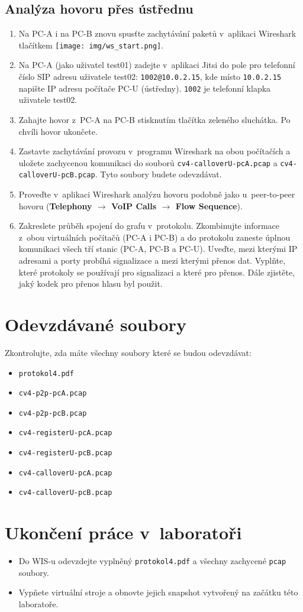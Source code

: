 \subsection{Analýza hovoru přes ústřednu}
\begin{enumerate}
    \item Na PC-A i na PC-B znovu spusťte zachytávání paketů v aplikaci Wireshark tlačítkem \texttt{[image: img/ws\_start.png]}.
    \item Na PC-A (jako uživatel test01) zadejte v~aplikaci Jitsi do pole pro telefonní číslo SIP adresu uživatele test02: {\tt 1002@10.0.2.15}, kde místo {\tt 10.0.2.15} napište IP adresu počítače PC-U (ústředny). {\tt 1002} je telefonní klapka uživatele test02.
    \item Zahajte hovor z~PC-A na PC-B stisknutím tlačítka zeleného sluchátka. Po chvíli hovor ukončete.
	\item Zastavte zachytávání provozu v~programu Wireshark na obou počítačích a uložete zachycenou komunikaci do souborů \texttt{cv4-calloverU-pcA.pcap} a \texttt{cv4-calloverU-pcB.pcap}. Tyto soubory budete odevzdávat.
	\item Proveďte v~aplikaci Wireshark analýzu hovoru podobně jako u~peer-to-peer hovoru ({\bf Telephony $\rightarrow$ VoIP Calls $\rightarrow$ \bf Flow Sequence}).
    \item Zakreslete průběh spojení do grafu v~protokolu. Zkombinujte informace z~obou virtuálních počítačů (PC-A i PC-B) a do protokolu zaneste úplnou komunikaci všech
      tří stanic (PC-A, PC-B a PC-U). Uveďte, mezi kterými IP adresami a porty probíhá signalizace a mezi kterými přenos dat. Vyplňte, které protokoly se používají pro signalizaci a které pro přenos. Dále zjistěte, jaký kodek pro přenos hlasu byl použit.
\end{enumerate}


\section*{Odevzdávané soubory}
Zkontrolujte, zda máte všechny soubory které se budou odevzdávat:
\begin{itemize}
  \item \texttt{protokol4.pdf}
  \item \texttt{cv4-p2p-pcA.pcap}
  \item \texttt{cv4-p2p-pcB.pcap}
  \item \texttt{cv4-registerU-pcA.pcap}
  \item \texttt{cv4-registerU-pcB.pcap}
  \item \texttt{cv4-calloverU-pcA.pcap}
  \item \texttt{cv4-calloverU-pcB.pcap}
\end{itemize}

\section*{Ukončení práce v~laboratoři}
\begin{itemize}
	\item Do WIS-u odevzdejte vyplněný \texttt{protokol4.pdf} a všechny zachycené \texttt{pcap} soubory.
	\item Vypňete virtuální stroje a obnovte jejich snapshot vytvořený na začátku této laboratoře.
\end{itemize}
